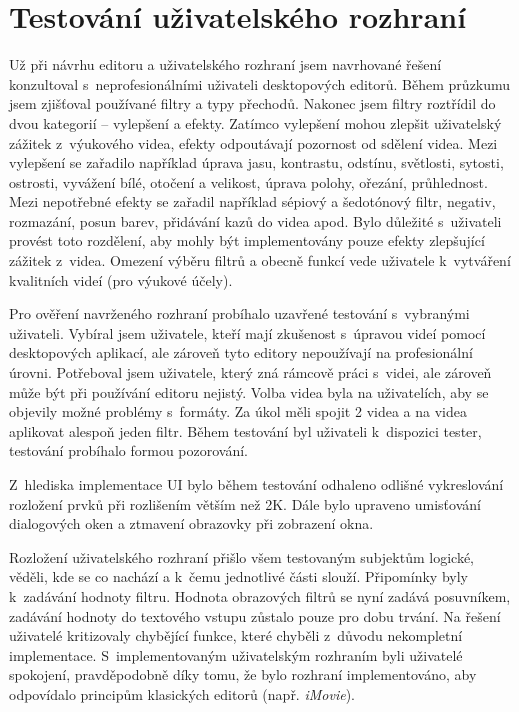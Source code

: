 \section{Testování uživatelského rozhraní}
Už při návrhu editoru a uživatelského rozhraní jsem navrhované řešení konzultoval s~neprofesionálními uživateli desktopových editorů. Během průzkumu jsem zjišťoval používané filtry a typy přechodů. Nakonec jsem filtry roztřídil do dvou kategorií -- vylepšení a efekty. Zatímco vylepšení mohou zlepšit uživatelský zážitek z~výukového videa, efekty odpoutávají pozornost od sdělení videa. Mezi vylepšení se zařadilo například úprava jasu, kontrastu, odstínu, světlosti, sytosti, ostrosti, vyvážení bílé, otočení a velikost, úprava polohy, ořezání, průhlednost. Mezi nepotřebné efekty se zařadil například sépiový a šedotónový filtr, negativ, rozmazání, posun barev, přidávání kazů do videa apod. Bylo důležité s~uživateli provést toto rozdělení, aby mohly být implementovány pouze efekty zlepšující zážitek z~videa. Omezení výběru filtrů a obecně funkcí vede uživatele k~vytváření kvalitních videí (pro výukové účely).

Pro ověření navrženého rozhraní probíhalo uzavřené testování s~vybranými uživateli. Vybíral jsem uživatele, kteří mají zkušenost s~úpravou videí pomocí desktopových aplikací, ale zároveň tyto editory nepoužívají na profesionální úrovni. Potřeboval jsem uživatele, který zná rámcově práci s~videi, ale zároveň může být při používání editoru nejistý. Volba videa byla na uživatelích, aby se objevily možné problémy s~formáty. Za úkol měli spojit 2 videa a na videa aplikovat alespoň jeden filtr. Během testování byl uživateli k~dispozici tester, testování probíhalo formou pozorování.

Z~hlediska implementace UI bylo během testování odhaleno odlišné vykreslování rozložení prvků při rozlišením větším než 2K. Dále bylo upraveno umisťování dialogových oken a ztmavení obrazovky při zobrazení okna.

Rozložení uživatelského rozhraní přišlo všem testovaným subjektům logické, věděli, kde se co nachází a k~čemu jednotlivé části slouží. Připomínky byly k~zadávání hodnoty filtru. Hodnota obrazových filtrů se nyní zadává posuvníkem, zadávání hodnoty do textového vstupu zůstalo pouze pro dobu trvání. Na řešení uživatelé kritizovaly chybějící funkce, které chyběli z~důvodu nekompletní implementace. S~implementovaným uživatelským rozhraním byli uživatelé spokojení, pravděpodobně díky tomu, že bylo rozhraní implementováno, aby odpovídalo principům klasických editorů (např. \textit{iMovie}).

